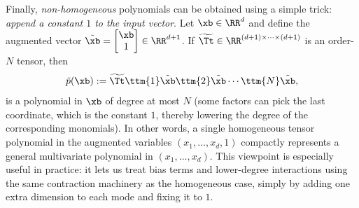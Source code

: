 \vspace{0.2cm}
\noindent
Finally, \emph{non-homogeneous} polynomials can be obtained using a simple trick: \emph{append a constant $1$ to the input vector}. Let $\xb\in\RR^d$ and define the augmented vector $\tilde{\xb} =\begin{bmatrix}\xb\\1\end{bmatrix}\in\RR^{d+1}$. If $\widetilde{\Tt}\in\RR^{(d+1)\times\cdots\times(d+1)}$ is an order-$N$ tensor, then
\[
\tilde{p}(\xb)
:=
\widetilde{\Tt} \ttm{1}\tilde{\xb}\ttm{2}\tilde{\xb}\cdots\ttm{N}\tilde{\xb},
\]
is a polynomial in $\xb$ of degree at most $N$ (some factors can pick the last coordinate, which is the constant $1$, thereby lowering the degree of the corresponding monomials). In other words, a single homogeneous tensor polynomial in the augmented variables $(x_1,\dots,x_d,1)$ compactly represents a general multivariate polynomial in $(x_1,\dots,x_d)$. This viewpoint is especially useful in practice: it lets us treat bias terms and lower-degree interactions using the same contraction machinery as the homogeneous case, simply by adding one extra dimension to each mode and fixing it to $1$.  
